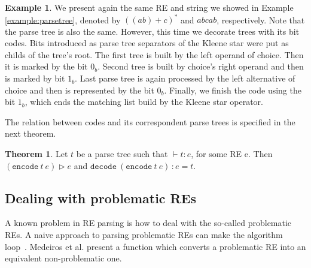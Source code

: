 \documentclass[review]{elsarticle}
\newcommand{\inl}{\ensuremath{\texttt{inl}}}
\newcommand{\inr}{\ensuremath{\texttt{inr}}}
\newcommand{\code}{\ensuremath{\texttt{encode}}}
\newcommand{\decodee}{\ensuremath{\texttt{decode}}}
\theoremstyle{definition}
\newtheorem{Theorem}{Theorem}
\newtheorem{Example}{Example}
\begin{document}
\begin{Example}
We present again the same RE and string we showed in Example \ref{example:parsetree},
denoted by $((ab) + c)^*$ and $abcab$, respectively. Note that the parse tree is also the same.
However, this time we decorate trees with its bit codes. Bits introduced as
parse tree separators of the Kleene star were put as childs of the tree's root.
The first tree is built by the left operand of choice. Then it is marked by the
bit $0_b$. Second tree is built by choice's right operand and then is marked by
bit $1_b$. Last parse tree is again processed by the left
alternative of choice and then is represented by the bit $0_b$. Finally, we
finish the code using the bit $1_b$, which ends the matching list build by the
Kleene star operator.

\begin{center}
\end{center}

\end{Example}


The relation between codes and its correspondent parse trees is specified in the next
theorem.

\begin{Theorem}
  Let $t$ be a parse tree such that $\vdash t : e$, for some RE e. Then $(\code\: t\: e) \rhd e$ and
  $\decodee\:(\code\: t\: e)\,: e = t$.
\end{Theorem}


\subsection{Dealing with problematic REs}\label{subsection:problematic}

A known problem in RE parsing is how to deal with the so-called problematic REs. A naive approach to 
parsing problematic REs can make the algorithm loop~\cite{Frisch2004}. Medeiros et al. \cite{Medeiros14}
present a function which converts a problematic RE into an equivalent non-problematic one.
\end{document}
